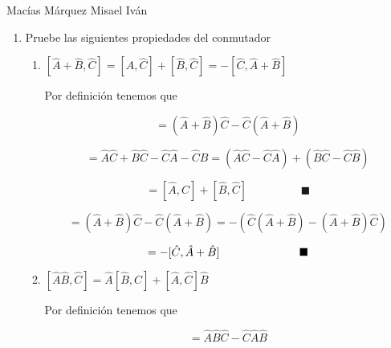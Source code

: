 \documentclass[12pt,a4paper]{article}
\begin{document}
Macías Márquez Misael Iván

\begin{enumerate}





    \item Pruebe las siguientes propiedades del conmutador
    
    \begin{enumerate}
        \item $[\hat{A} + \hat{B}, \hat{C}] = [\hat{A},\hat{C}] + [\hat{B}, \hat{C}] = -[\hat{C},\hat{A} + \hat{B}]$
        
        Por definición tenemos que
        
        \begin{equation*}
            [\hat{A} + \hat{B}, \hat{C}] = (\hat{A} + \hat{B}) \hat{C} - \hat{C}(\hat{A} + \hat{B})
        \end{equation*}
        
        \begin{equation*}
            =\hat{A}\hat{C} + \hat{B}\hat{C} -\hat{C} \hat{A} - \hat{C} \hat{B} = (\hat{A}\hat{C}-\hat{C} \hat{A}) + (\hat{B}\hat{C} - \hat{C} \hat{B} )
        \end{equation*}
        
        \begin{equation*}
            =[\hat{A},\hat{C}] + [\hat{B}, \hat{C}] \hspace{2cm} \blacksquare 
        \end{equation*}
        
        \begin{equation*}
            = (\hat{A} + \hat{B}) \hat{C} - \hat{C}(\hat{A} + \hat{B}) = -(\hat{C}(\hat{A} + \hat{B})-(\hat{A} + \hat{B}) \hat{C}) 
        \end{equation*}
        
        \begin{equation*}
            = -[\hat{C}, \hat{A} + \hat{B}] \hspace{2.5cm} \blacksquare
        \end{equation*}
        
        \item $[\hat{A}\hat{B},\hat{C}] = \hat{A}[\hat{B},\hat{C}] + [\hat{A}, \hat{C}]\hat{B}$
        
        Por definición tenemos que
        
        \begin{equation*}
            [\hat{A}\hat{B},\hat{C}] = \hat{A}\hat{B} \hat{C} - \hat{C}\hat{A}\hat{B} 
        \end{equation*}
        

\end{enumerate}
\end{enumerate}
\end{document}
